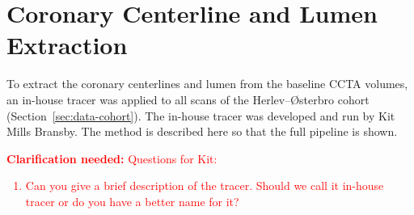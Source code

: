 
\newpage

\providecommand{\clarify}[1]{\textcolor{red}{\textbf{Clarification needed:} #1}}
\providecommand{\ask}[1]{\textcolor{red}{[#1]}}
\section{Coronary Centerline and Lumen Extraction}
\label{sec:method-tracer}

To extract the coronary centerlines and lumen from the baseline CCTA volumes, an in-house tracer was applied to all scans of the Herlev--{\O}sterbro cohort (Section~\ref{sec:data-cohort}). The in-house tracer was developed and run by Kit Mills Bransby. The method is described here so that the full pipeline is shown. 


\clarify{Questions for Kit:
\begin{enumerate}
  \item Can you give a brief description of the tracer. Should we call it in-house tracer or do you have a better name for it?
\end{enumerate}}
